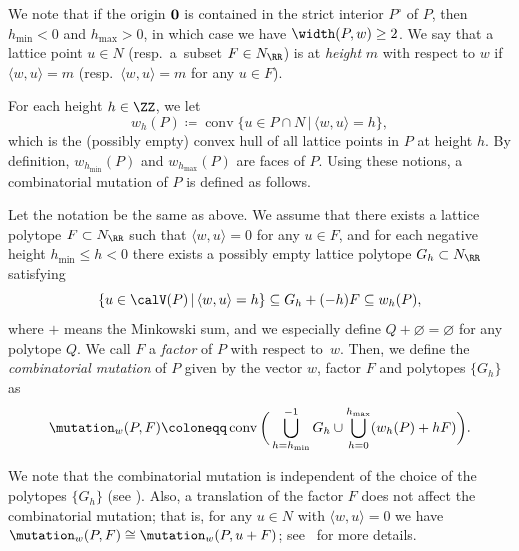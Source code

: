 We note that if the origin ${\bf 0}$ is contained in the strict interior $P^\circ$ of $P$, then $h_{\min}<0$ and $h_{\max}>0$, in which case we have $\width(P,w)\ge2$.
We say that a lattice point $u\in N$ (resp.\ a~subset $F\in N_\RR$) is at \emph{height} $m$ with respect to $w$ if $\langle w,u\rangle=m$
(resp.\ $\langle w,u\rangle=m$ for any $u\in F$).

For each height $h\in\ZZ$, we let
\begin{displaymath}
w_h(P)\coloneqq\operatorname{conv}\{u\in P\cap N \,|\, \langle w,u\rangle=h\},
\end{displaymath}
which is the (possibly empty) convex hull of all lattice points in $P$ at height $h$.
By definition, $w_{h_{\min}}(P)$ and $w_{h_{\max}}(P)$ are faces of $P$.
Using these notions, a combinatorial mutation of $P$ is defined as follows.

\begin{Definition}\label{def_mutation_polygon}
Let the notation be the same as above.
We assume that there exists a lattice polytope $F\subset N_\RR$ such that $\langle w,u\rangle=0$ for any $u\in F$, and
for each negative height $h_{\min}\le h<0$ there exists a possibly empty lattice polytope $G_h\subset N_\RR$ satisfying
\begin{equation}\label{condition_Gh}
\{u\in\calV(P)\,|\, \langle w,u \rangle=h\}\subseteq G_h+(-h)F\subseteq w_h(P),
\end{equation}
where $+$ means the Minkowski sum, and we especially define $Q+\varnothing=\varnothing$ for any polytope $Q$.
We call $F$ a \emph{factor} of $P$ with respect to~$w$.
Then, we define the \emph{combinatorial mutation} of $P$ given by the vector $w$, factor $F$ and polytopes $\{G_h\}$ as
\begin{displaymath}
\mutation_w(P,F)\coloneqq\operatorname{conv}\bigg(\bigcup_{h=h_{\min}}^{-1}G_h\cup\bigcup_{h=0}^{h_{\max}}(w_h(P)+hF)\bigg).
\end{displaymath}
\end{Definition}

We note that the combinatorial mutation is independent of the choice of the polytopes $\{G_h\}$ (see \cite[Proposition~1]{ACGK}).
Also, a translation of the factor $F$ does not affect the combinatorial mutation; that is,
for any $u\in N$ with $\langle w,u\rangle=0$ we have $\mutation_w(P,F)\cong\mutation_w(P,u+F)$; see~\cite{ACGK} for more details.

